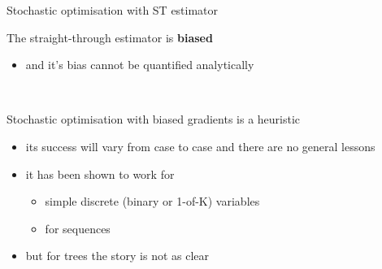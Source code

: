 \begin{frame}{Stochastic optimisation with ST estimator}

The straight-through estimator is {\bf biased}
\begin{itemize}
	\item and it's bias cannot be quantified analytically 
\end{itemize}

~

Stochastic optimisation with biased gradients is a heuristic
\begin{itemize}
	\item its success will vary from case to case and there are no general lessons
	\item it has been shown to work for 
	\begin{itemize}
		\item simple discrete (binary or 1-of-K) variables \citep{jang2016categorical}
		\item for sequences \citep{havrylov2017emergence}
	\end{itemize}
	\item but for trees the story is not as clear \citep{choi2017learning}
\end{itemize}

\end{frame}

